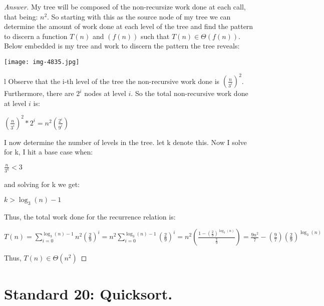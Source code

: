 \documentclass[11pt]{article}
\theoremstyle{definition}
\theoremstyle{definition}
\theoremstyle{definition}
\begin{document}
\begin{proof}[Answer]

My tree will be composed of the non-recursize work done at each call, that being: $n^2$. So starting with this as the source node of my tree we can determine the amount of work done at each level of the tree and find the pattern to discern a function $T(n)$ and $(f(n))$ such that $T(n) \in \Theta(f(n))$. Below embedded is my tree and work to discern the pattern the tree reveals:


\texttt{[image: img-4835.jpg]}


l Observe that the i-th level of the tree the non-recursive work done is $(\frac{n}{3^i})^2$. Furthermore, there are $2^i$ nodes at level $i$. So the total non-recursive work done at level $i$ is:

$(\frac{n}{3^i})^{2}*2^i = n^2(\frac{2^i}{9^i})$

I now determine the number of levels in the tree. let k denote this. Now I solve for k, I hit a base case when:

$\frac{n}{3^k}<3$

and solving for k we get:

$k>\log_3(n)-1$

Thus, the total work done for the recurrence relation is:

$T(n) = \sum_{i=0}^{\log_3(n)-1}n^2(\frac{2}{9})^i = n^2\sum_{i=0}^{\log_3(n)-1}(\frac{2}{9})^i = n^2(\frac{1-(\frac{2}{9})^{\log_3(n)}}{\frac{7}{9}}) = \frac{9n^2}{7}-(\frac{9}{7})(\frac{2}{9})^{\log_3(n)}$


Thus, $T(n) \in \Theta(n^2)$
\end{proof}



\newpage
\section{Standard 20: Quicksort.}
\end{document}
